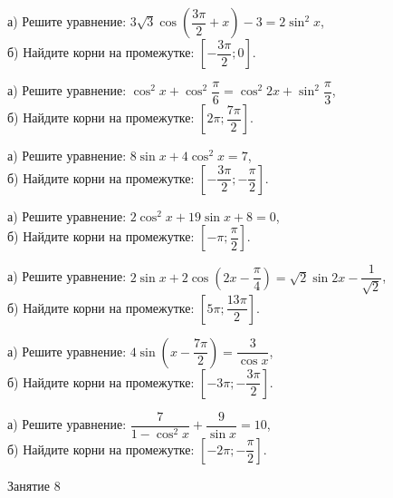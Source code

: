 \begin{class}[number=7]
	\begin{listofex}
		\item
		а) Решите уравнение: \( 3\sqrt{3} \cos{\left( \dfrac{3\pi}{2} + x \right)} -3=2\sin^2{x}  \),\\[0.5em]
		б) Найдите корни на промежутке: \( \left[ -\dfrac{3\pi}{2}; 0 \right] \).
		\item
		а) Решите уравнение: \( \cos^2{x}+\cos^2{\dfrac{\pi}{6}} = \cos^2{2x} + \sin^2{\dfrac{\pi}{3}} \),\\[0.5em]
		б) Найдите корни на промежутке: \( \left[ 2\pi; \dfrac{7\pi}{2} \right] \).
		\item
		а) Решите уравнение:
		\( 8 \sin{x}+4\cos^2{x}=7 \),\\[0.5em]
		б) Найдите корни на промежутке:
		\( \left[ -\dfrac{3\pi}{2}; -\dfrac{\pi}{2} \right] \).
		\item
		а) Решите уравнение:
		\( 2 \cos^2{x} + 19 \sin{x}+8=0 \),\\[0.5em]
		б) Найдите корни на промежутке:
		\( \left[ -\pi; \dfrac{\pi}{2} \right] \).
		\item
		а) Решите уравнение:
		\( 2\sin x+2\cos\left( 2x-\dfrac{\pi}{4} \right)=\sqrt{2}\sin2x-\dfrac{1}{\sqrt{2}} \),\\[0.5em]
		б) Найдите корни на промежутке:
		\( \left[ 5\pi; \dfrac{13\pi}{2} \right] \).
		\item
		а) Решите уравнение:
		\( 4\sin\left( x-\dfrac{7\pi}{2} \right)=\dfrac{3}{\cos x} \),\\[0.5em]
		б) Найдите корни на промежутке:
		\( \left[ -3\pi; -\dfrac{3\pi}{2} \right] \).
		\item
		а) Решите уравнение:
		\( \dfrac{7}{1-\cos^2 x}+\dfrac{9}{\sin x}=10 \),\\[0.5em]
		б) Найдите корни на промежутке:
		\( \left[ -2\pi;-\dfrac{\pi}{2} \right] \).
	\end{listofex}
\end{class}

\begin{exam}
	\begin{listofex}
		\item Занятие 8
	\end{listofex}
\end{exam}

